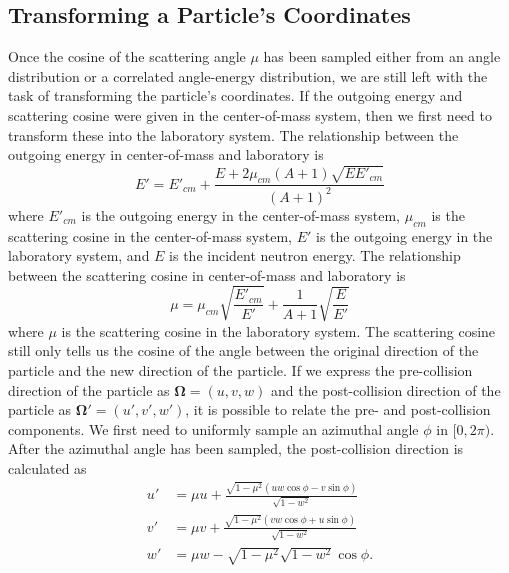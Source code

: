 \subsection{Transforming a Particle's Coordinates}
\label{sec:transform-coordinates}

Once the cosine of the scattering angle $\mu$ has been sampled either from an
angle distribution or a correlated angle-energy distribution, we are still left
with the task of transforming the particle's coordinates. If the outgoing energy
and scattering cosine were given in the center-of-mass system, then we first
need to transform these into the laboratory system. The relationship between the
outgoing energy in center-of-mass and laboratory is
\begin{equation}
  \label{eq:energy-com-to-lab}
  E' = E'_{cm} + \frac{E + 2\mu_{cm} (A + 1) \sqrt{EE'_{cm}}}{(A+1)^2}
\end{equation}
where $E'_{cm}$ is the outgoing energy in the center-of-mass system,
$\mu_{cm}$ is the scattering cosine in the center-of-mass system,
$E'$ is the outgoing energy in the laboratory system, and $E$ is the
incident neutron energy. The relationship between the scattering cosine in
center-of-mass and laboratory is
\begin{equation}
  \label{eq:angle-com-to-lab}
  \mu = \mu_{cm} \sqrt{\frac{E'_{cm}}{E'}} + \frac{1}{A + 1}
  \sqrt{\frac{E}{E'}}
\end{equation}
where $\mu$ is the scattering cosine in the laboratory system. The
scattering cosine still only tells us the cosine of the angle between the
original direction of the particle and the new direction of the particle. If we
express the pre-collision direction of the particle as $\mathbf{\Omega} =
(u,v,w)$ and the post-collision direction of the particle as
$\mathbf{\Omega}' = (u',v',w')$, it is possible to relate the pre- and
post-collision components. We first need to uniformly sample an azimuthal angle
$\phi$ in $[0, 2\pi)$. After the azimuthal angle has been sampled,
the post-collision direction is calculated as
\begin{equation}
  \label{eq:post-collision-angle}
  \begin{split}
    u' &= \mu u + \frac{\sqrt{1 - \mu^2} ( uw \cos\phi - v \sin\phi )}{\sqrt{1 -
        w^2}} \\
    v' &= \mu v + \frac{\sqrt{1 - \mu^2} ( vw \cos\phi + u \sin\phi )}{\sqrt{1 -
        w^2}} \\
    w' &= \mu w - \sqrt{1 - \mu^2} \sqrt{1 - w^2} \cos\phi.
  \end{split}
\end{equation}

